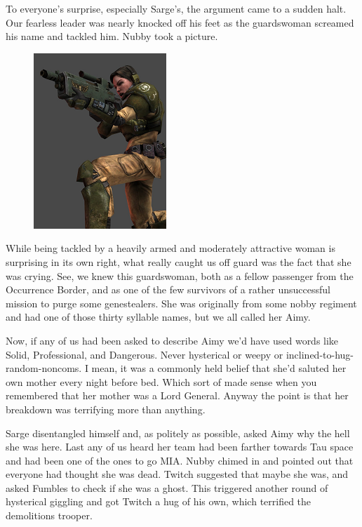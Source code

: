 To everyone's surprise, especially Sarge's, the argument came to a sudden halt. 
Our fearless leader was nearly knocked off his feet as the guardswoman screamed his name and tackled him. 
Nubby took a picture.

\begin{figure}
	\begin{center}
		\includegraphics[width=\figwidth]{pics/11/19.png}
	\end{center}
\end{figure}
While being tackled by a heavily armed and moderately attractive woman is surprising in its own right, what really caught us off guard was the fact that she was crying. 
See, we knew this guardswoman, both as a fellow passenger from the Occurrence Border, and as one of the few survivors of a rather unsuccessful mission to purge some genestealers. 
She was originally from some nobby regiment and had one of those thirty syllable names, but we all called her Aimy.

Now, if any of us had been asked to describe Aimy we'd have used words like Solid, Professional, and Dangerous. 
Never hysterical or weepy or inclined-to-hug-random-noncoms. 
I mean, it was a commonly held belief that she'd saluted her own mother every night before bed. 
Which sort of made sense when you remembered that her mother was a Lord General. 
Anyway the point is that her breakdown was terrifying more than anything.

Sarge disentangled himself and, as politely as possible, asked Aimy why the hell she was here. 
Last any of us heard her team had been farther towards Tau space and had been one of the ones to go MIA. 
Nubby chimed in and pointed out that everyone had thought she was dead. 
Twitch suggested that maybe she was, and asked Fumbles to check if she was a ghost. 
This triggered another round of hysterical giggling and got Twitch a hug of his own, which terrified the demolitions trooper.

